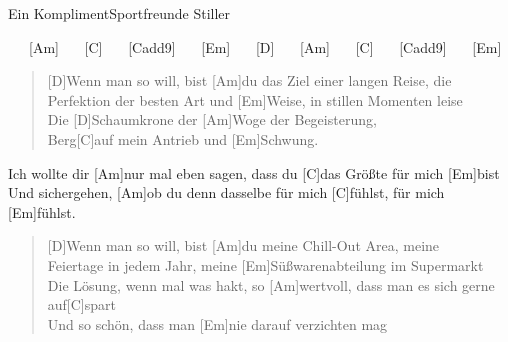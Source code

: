 \begin{song}{Ein Kompliment}{Sportfreunde Stiller}

    \begin{intro}
        [D] \ \ \ [Am] \ \ \ [C] \ \ \ [Cadd9] \ \ \ [Em] \ \ \
        [D] \ \ \ [Am] \ \ \ [C] \ \ \ [Cadd9] \ \ \ [Em]
    \end{intro}

    \begin{verse}  
        [D]Wenn man so will, bist [Am]du das Ziel einer langen Reise, die \\
        [C]Perfektion der besten Art und [Em]Weise, in stillen Momenten leise \\
        Die [D]Schaumkrone der [Am]Woge der Begeisterung, \\
        Berg[C]auf mein Antrieb und [Em]Schwung.
    \end{verse}  

    \begin{chorus}
        [D]Ich wollte dir [Am]nur mal eben sagen, dass du [C]das Größte für mich [Em]bist \\
        [D]Und sichergehen, [Am]ob du denn dasselbe für mich [C]fühlst, für mich [Em]fühlst.
    \end{chorus}

    \begin{verse}  
        [D]Wenn man so will, bist [Am]du meine Chill-Out Area, meine \\
        [C]Feiertage in jedem Jahr, meine [Em]Süßwarenabteilung im Supermarkt \\
        [D]Die Lösung, wenn mal was hakt, so [Am]wertvoll, dass man es sich gerne auf[C]spart \\
        Und so schön, dass man [Em]nie darauf verzichten mag
    \end{verse}  


\end{song}
